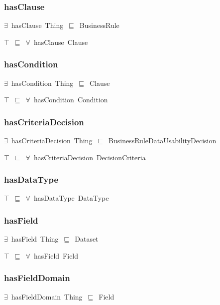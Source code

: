 \documentclass{article}
\begin{document}
\subsubsection*{hasClause}

\ensuremath{\exists}~hasClause~Thing~\ensuremath{\sqsubseteq}~BusinessRule

\ensuremath{\top}~\ensuremath{\sqsubseteq}~\ensuremath{\forall}~hasClause~Clause

\subsubsection*{hasCondition}

\ensuremath{\exists}~hasCondition~Thing~\ensuremath{\sqsubseteq}~Clause

\ensuremath{\top}~\ensuremath{\sqsubseteq}~\ensuremath{\forall}~hasCondition~Condition

\subsubsection*{hasCriteriaDecision}

\ensuremath{\exists}~hasCriteriaDecision~Thing~\ensuremath{\sqsubseteq}~BusinessRuleDataUsabilityDecision

\ensuremath{\top}~\ensuremath{\sqsubseteq}~\ensuremath{\forall}~hasCriteriaDecision~DecisionCriteria

\subsubsection*{hasDataType}

\ensuremath{\top}~\ensuremath{\sqsubseteq}~\ensuremath{\forall}~hasDataType~DataType

\subsubsection*{hasField}

\ensuremath{\exists}~hasField~Thing~\ensuremath{\sqsubseteq}~Dataset

\ensuremath{\top}~\ensuremath{\sqsubseteq}~\ensuremath{\forall}~hasField~Field

\subsubsection*{hasFieldDomain}

\ensuremath{\exists}~hasFieldDomain~Thing~\ensuremath{\sqsubseteq}~Field
\end{document}
